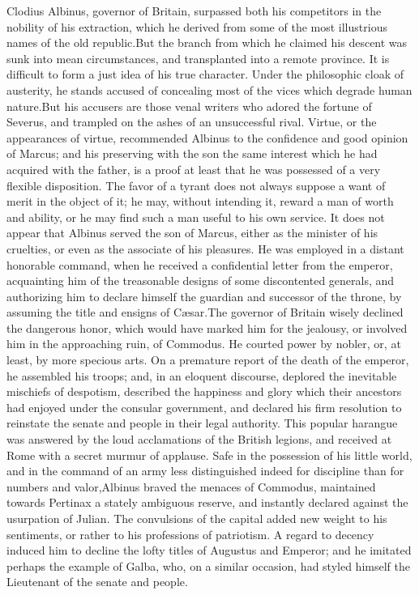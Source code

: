 Clodius Albinus, governor of Britain, surpassed both his
competitors in the nobility of his extraction, which he derived
from some of the most illustrious names of the old republic.\footnotemark[16]
But the branch from which he claimed his descent was sunk into
mean circumstances, and transplanted into a remote province. It
is difficult to form a just idea of his true character. Under the
philosophic cloak of austerity, he stands accused of concealing
most of the vices which degrade human nature.\footnotemark[17] But his accusers
are those venal writers who adored the fortune of Severus, and
trampled on the ashes of an unsuccessful rival. Virtue, or the
appearances of virtue, recommended Albinus to the confidence and
good opinion of Marcus; and his preserving with the son the same
interest which he had acquired with the father, is a proof at
least that he was possessed of a very flexible disposition. The
favor of a tyrant does not always suppose a want of merit in the
object of it; he may, without intending it, reward a man of worth
and ability, or he may find such a man useful to his own service.
It does not appear that Albinus served the son of Marcus, either
as the minister of his cruelties, or even as the associate of his
pleasures. He was employed in a distant honorable command, when
he received a confidential letter from the emperor, acquainting
him of the treasonable designs of some discontented generals, and
authorizing him to declare himself the guardian and successor of
the throne, by assuming the title and ensigns of Cæsar.\footnotemark[18] The
governor of Britain wisely declined the dangerous honor, which
would have marked him for the jealousy, or involved him in the
approaching ruin, of Commodus. He courted power by nobler, or, at
least, by more specious arts. On a premature report of the death
of the emperor, he assembled his troops; and, in an eloquent
discourse, deplored the inevitable mischiefs of despotism,
described the happiness and glory which their ancestors had
enjoyed under the consular government, and declared his firm
resolution to reinstate the senate and people in their legal
authority. This popular harangue was answered by the loud
acclamations of the British legions, and received at Rome with a
secret murmur of applause. Safe in the possession of his little
world, and in the command of an army less distinguished indeed
for discipline than for numbers and valor,\footnotemark[19] Albinus braved the
menaces of Commodus, maintained towards Pertinax a stately
ambiguous reserve, and instantly declared against the usurpation
of Julian. The convulsions of the capital added new weight to his
sentiments, or rather to his professions of patriotism. A regard
to decency induced him to decline the lofty titles of Augustus
and Emperor; and he imitated perhaps the example of Galba, who,
on a similar occasion, had styled himself the Lieutenant of the
senate and people.\footnotemark[20]


